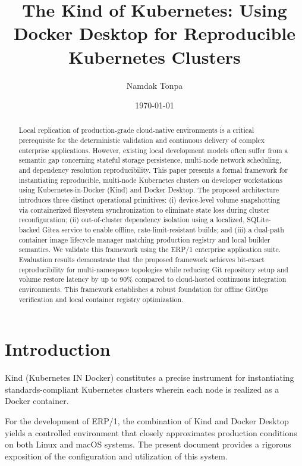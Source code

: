 \documentclass{article}
\title{The Kind of Kubernetes: Using Docker Desktop for Reproducible Kubernetes Clusters}
\author{Namdak Tonpa}
\date{\today}
\begin{document}
\maketitle

\begin{abstract}
Local replication of production-grade cloud-native environments is a critical prerequisite
for the deterministic validation and continuous delivery of complex enterprise applications.
However, existing local development models often suffer from a semantic gap concerning stateful
storage persistence, multi-node network scheduling, and dependency resolution reproducibility.
This paper presents a formal framework for instantiating reproducible, multi-node Kubernetes
clusters on developer workstations using Kubernetes-in-Docker (Kind) and Docker Desktop.
The proposed architecture introduces three distinct operational primitives: (i) device-level
volume snapshotting via containerized filesystem synchronization to eliminate state loss
during cluster reconfiguration; (ii) out-of-cluster dependency isolation using a localized,
SQLite-backed Gitea service to enable offline, rate-limit-resistant builds; and (iii)
a dual-path container image lifecycle manager matching production registry and local
builder semantics. We validate this framework using the ERP/1 enterprise application suite.
Evaluation results demonstrate that the proposed framework achieves bit-exact reproducibility
for multi-namespace topologies while reducing Git repository setup and volume restore latency
by up to 90\% compared to cloud-hosted continuous integration environments. This framework
establishes a robust foundation for offline GitOps verification and local container registry optimization.
\end{abstract}

\newpage
\tableofcontents

\section{Introduction}

Kind (Kubernetes IN Docker) constitutes a precise instrument for instantiating standards-compliant Kubernetes
clusters wherein each node is realized as a Docker container.

For the development of ERP/1, the combination of Kind and Docker Desktop yields a controlled environment that
closely approximates production conditions on both Linux and macOS systems. The present document provides a
rigorous exposition of the configuration and utilization of this system.
\end{document}
